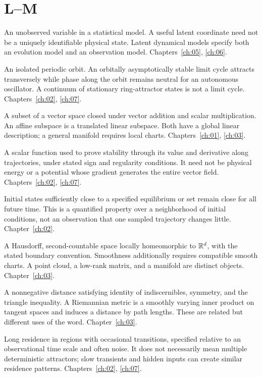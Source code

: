 \section*{L--M}
\begin{description}[style=nextline]
\item[Latent variable.] An unobserved variable in a statistical model. A useful latent coordinate need not be a uniquely identifiable physical state. Latent dynamical models specify both an evolution model and an observation model. Chapters~\ref{ch:05}, \ref{ch:06}.
\item[Limit cycle.] An isolated periodic orbit. An orbitally asymptotically stable limit cycle attracts transversely while phase along the orbit remains neutral for an autonomous oscillator. A continuum of stationary ring-attractor states is not a limit cycle. Chapters~\ref{ch:02}, \ref{ch:07}.
\item[Linear subspace.] A subset of a vector space closed under vector addition and scalar multiplication. An affine subspace is a translated linear subspace. Both have a global linear description; a general manifold requires local charts. Chapters~\ref{ch:01}, \ref{ch:03}.
\item[Lyapunov function.] A scalar function used to prove stability through its value and derivative along trajectories, under stated sign and regularity conditions. It need not be physical energy or a potential whose gradient generates the entire vector field. Chapters~\ref{ch:02}, \ref{ch:07}.
\item[Lyapunov stability.] Initial states sufficiently close to a specified equilibrium or set remain close for all future time. This is a quantified property over a neighborhood of initial conditions, not an observation that one sampled trajectory changes little. Chapter~\ref{ch:02}.
\item[Manifold.] A Hausdorff, second-countable space locally homeomorphic to $\mathbb{R}^d$, with the stated boundary convention. Smoothness additionally requires compatible smooth charts. A point cloud, a low-rank matrix, and a manifold are distinct objects. Chapter~\ref{ch:03}.
\item[Metric.] A nonnegative distance satisfying identity of indiscernibles, symmetry, and the triangle inequality. A Riemannian metric is a smoothly varying inner product on tangent spaces and induces a distance by path lengths. These are related but different uses of the word. Chapter~\ref{ch:03}.
\item[Metastability.] Long residence in regions with occasional transitions, specified relative to an observational time scale and often noise. It does not necessarily mean multiple deterministic attractors; slow transients and hidden inputs can create similar residence patterns. Chapters~\ref{ch:02}, \ref{ch:07}.
\end{description}

